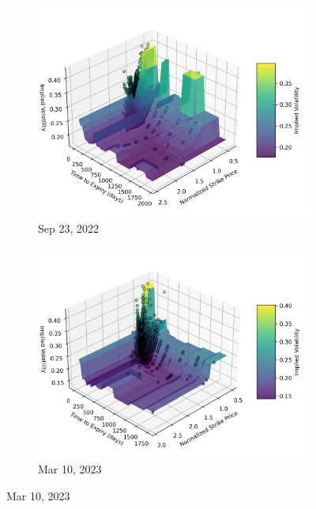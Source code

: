 \documentclass{article}
\begin{document}
\begin{figure}[!h]
    \centering
    \begin{subfigure}{0.49\textwidth} %
        \centering
        \includegraphics[width=\linewidth]{img/vol_surface_20220923.png}
        \caption{Sep 23, 2022}
    \end{subfigure}
    \hfill
    \begin{subfigure}{0.49\textwidth} %
        \centering
        \includegraphics[width=\linewidth]{img/vol_surface_20230310.png}
        \caption{Mar 10, 2023}
    \end{subfigure}

    \vspace{0.5cm} %


\end{figure}
\end{document}
